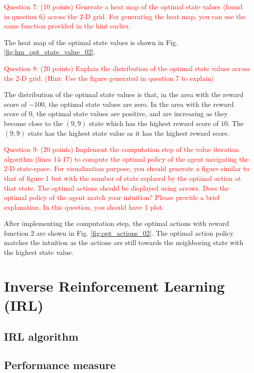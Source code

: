 \documentclass[11pt]{article}
\begin{document}
\textcolor{red}{
    Question 7: (10 points) Generate a heat map of the optimal state values (found in question 6) across the 2-D grid. For generating the heat map, you can use the same function provided in the hint earlier.
}

The heat map of the optimal state values is shown in Fig. \ref{fig:hm_opt_state_value_02}.
\vspace{10pt}

\textcolor{red}{
    Question 8: (20 points) Explain the distribution of the optimal state values across the 2-D grid. (Hint: Use the figure generated in question 7 to explain)
}

The distribution of the optimal state values is that, in the area with the reward score of $-100$, the optimal state values are zero. In the area with the reward score of $0$, the optimal state values are positive, and are increasing as they become close to the $(9,9)$ state which has the highest reward score of $10$. The $(9,9)$ state has the highest state value as it has the highest reward score.

\textcolor{red}{
    Question 9: (20 points) Implement the computation step of the value iteration algorithm (lines 14-17) to compute the optimal policy of the agent navigating the 2-D state-space. For visualization purpose, you should generate a figure
similar to that of figure 1 but with the number of state replaced by the optimal action at that state. The optimal actions should be displayed using arrows. Does the optimal policy of the agent match your intuition? Please provide a
brief explanation. In this question, you should have 1 plot.
}

After implementing the computation step, the optimal actions with reward function $2$ are shown in Fig. \ref{fig:opt_actions_02}. The optimal action policy matches the intuition as the actions are still towards the neighboring state with the highest state value.









\section{Inverse Reinforcement Learning (IRL)}

\subsection{IRL algorithm}

\subsection{Performance measure}
\end{document}
